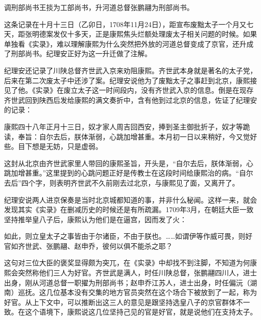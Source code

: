 
\begin{bookquote}调刑部尚书王掞为工部尚书，升河道总督张鹏翮为刑部尚书。\end{bookquote}


这条记录在十月十三日（乙卯日，1708年11月24日），距宣布废黜太子一个月又七天，距张明德案发仅十多天，正是康熙焦头烂额处理废太子相关问题的时候。如果单独看《实录》，难以理解康熙为什么突然把外放的河道总督变成了京官，还升成了刑部尚书。纪理安正好为这一升迁做了注解。



纪理安还记录了川陕总督齐世武入京来劝阻康熙。齐世武本身就是著名的太子党，后来在第二次废太子中还涉了案。纪理安说他为了废黜太子之事赶到北京，康熙接见了他。《实录》在废立太子这一时间段内，没有齐世武入京的信息。倒是在现存齐世武回到陕西后发给康熙的满文奏折中，含有他到过北京的信息，佐证了纪理安的记录：



\begin{bookquote}康熙四十八年正月十三日，奴才家人周吉回西安，捧到圣主御批折子，奴才等跪读，奉旨：自尔去后，朕体渐弱，心跳加增甚重。本月初一日以来稍好，今又觉好些。目下想是无妨，只是虚弱。\end{bookquote}


这封从北京由齐世武家里人带回的康熙圣旨，开头是，“自尔去后，朕体渐弱，心跳加增甚重。”这里提到的心跳问题正好是传教士在这段时间给康熙治的病。“自尔去后”四个字，则表明齐世武不久前刚去过北京，与康熙见了面，又离开了。



纪理安说两人进京保奏是当时北京城都知道的事，并非什么秘闻。这样一来，就会发现其实《实录》在删减历史的时候还是有所疏漏。1709年3月，在朝廷大臣一致坚持推举皇八子后，康熙认为他们是在逼宫，因而发了火：



\begin{bookquote}如此，则立皇太子之事皆由于尔诸臣，不由于朕也。……如谓伊等作威可畏，则好官如齐世武、张鹏翮、赵申乔，彼何以俱不能杀之耶？\end{bookquote}


这句对三位大臣的褒奖显得颇为突兀，在《实录》中却找不到注脚，不知道为何康熙会突然称他们三人为好官。齐世武是满人，时任川陕总督，张鹏翮四川人，进士出身，刚从河道总督一职擢为刑部尚书；赵申乔江苏人，进士出身，时任偏沅（湖南）巡抚。这几位基本没有交集的地方官员突然在这个场合下被放到了一起，称为好官。从上下文中，可以推断出这三人的意见是跟坚持选皇八子的京官群体不一致。在这个语境下，康熙说这几位坚持己见的官是好官，就是说他们在支持太子。


